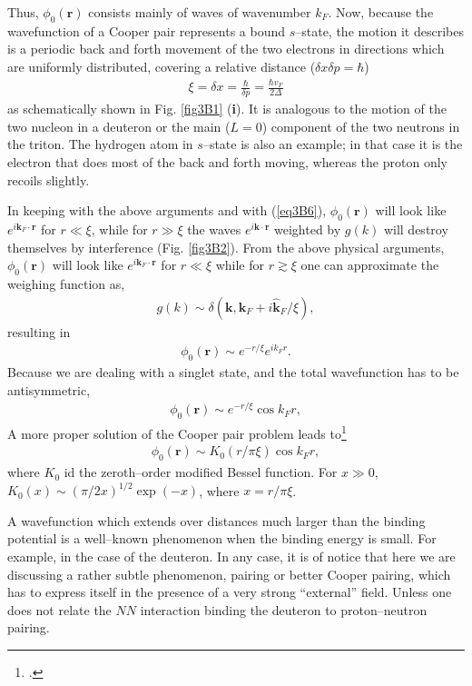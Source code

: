 \begin{subappendices}
Thus, $\phi_0(\mathbf r)$ consists mainly of waves of wavenumber $k_F$. Now, because the wavefunction of a Cooper pair represents a bound $s$--state, the motion it describes is a periodic back and forth movement of the two electrons in  directions which are uniformly distributed, covering a relative distance ($\delta x\delta p=\hbar$)
\begin{align}\label{eq3B6}
\xi=\delta x=\frac{\hbar}{\delta p}=\frac{\hbar v_F}{2\Delta}
\end{align}
as schematically shown in Fig. \ref{fig3B1} (\textbf{i}). It is analogous to the motion of the two nucleon in a deuteron or the main ($L=0$) component of the two neutrons in the triton. The hydrogen atom in $s$--state is also an example; in that case it is the electron that does most of the back and forth moving, whereas the proton only recoils slightly.

In keeping with the above arguments and with (\ref{eq3B6}), $\phi_0(\mathbf r)$ will look like $e^{i\mathbf k_F\cdot \mathbf r}$ for $r\ll\xi$, while for $r\gg \xi$ the waves $e^{i\mathbf k\cdot \mathbf r}$
weighted by $g(k)$ will destroy themselves by interference   (Fig. \ref{fig3B2}). From the above physical arguments, $\phi_0(\mathbf r)$ will look like $e^{i\mathbf k_F\cdot \mathbf r}$ for $r\ll\xi$ while for $r\gtrsim\xi$ one can approximate the weighing function as,
\begin{align}\label{eq3B7}
g(k)\sim\delta(\mathbf k,\mathbf k_F+i\mathbf{\hat k}_F/\xi),
\end{align}
resulting in
\begin{align}\label{eq3B8}
\phi_0(\mathbf r)\sim e^{-r/\xi}e^{ik_Fr}.
\end{align}
Because we are dealing with a singlet state, and the total wavefunction has to be antisymmetric,
\begin{align}\label{eq3B9}
\phi_0(\mathbf r)\sim e^{-r/\xi}\cos k_Fr,
\end{align}
 A more proper solution of the Cooper pair problem leads to\footnote{\cite{Kadin:07}.}
\begin{align}\label{eq3B10}
\phi_0(\mathbf r)\sim K_0(r/\pi\xi)\cos k_Fr,
\end{align}
where $K_0$ id the zeroth--order modified Bessel function. For $x\gg 0$, $K_0(x)\sim (\pi/2x)^{1/2}\exp(-x)$, where $x=r/\pi\xi$.


A wavefunction which extends over distances much larger than the binding potential is a well--known phenomenon when the binding energy is small. For example, in the case of the deuteron. In any case, it is of notice that here we are discussing a rather subtle phenomenon, pairing or better Cooper pairing, which has to express itself in the presence of a very strong ``external'' field. Unless one does not relate the $NN$ interaction binding the deuteron to proton--neutron pairing. 


\end{subappendices}
